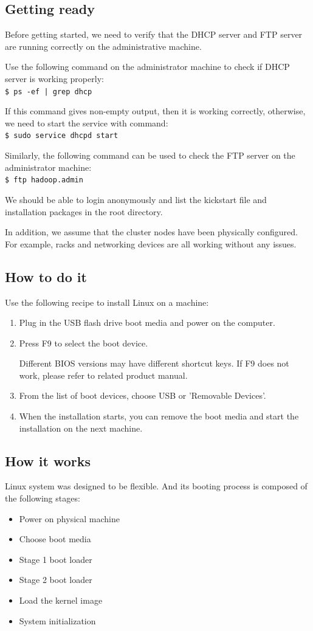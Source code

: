 \subsection*{Getting ready}
Before getting started, we need to verify that the DHCP server and FTP server are running correctly on the administrative machine.

Use the following command on the administrator machine to check if DHCP server is working properly:\\
\verb+$ ps -ef | grep dhcp+

If this command gives non-empty output, then it is working correctly, otherwise, we need to start the service with command: \\
\verb|$ sudo service dhcpd start|

Similarly, the following command can be used to check the FTP server on the administrator machine: \\
\verb|$ ftp hadoop.admin|

We should be able to login anonymously and list the kickstart file and installation packages in the root directory.

In addition, we assume that the cluster nodes have been physically configured. For example, racks and networking devices are all working without any issues.

\subsection*{How to do it}
Use the following recipe to install Linux on a machine:
\begin{enumerate}
  \item Plug in the USB flash drive boot media and power on the computer.
  \item Press F9 to select the boot device. \begin{warning} Different BIOS versions may have different shortcut keys. If F9 does not work, please refer to related product manual. \end{warning}
  \item From the list of boot devices, choose USB or 'Removable Devices'.
  \item When the installation starts, you can remove the boot media and start the installation on the next machine.
\end{enumerate}
\subsection*{How it works}
Linux system was designed to be flexible. And its booting process is composed of the following stages:
\begin{itemize}
  \item Power on physical machine
  \item Choose boot media
  \item Stage 1 boot loader
  \item Stage 2 boot loader
  \item Load the kernel image
  \item System initialization
\end{itemize}

